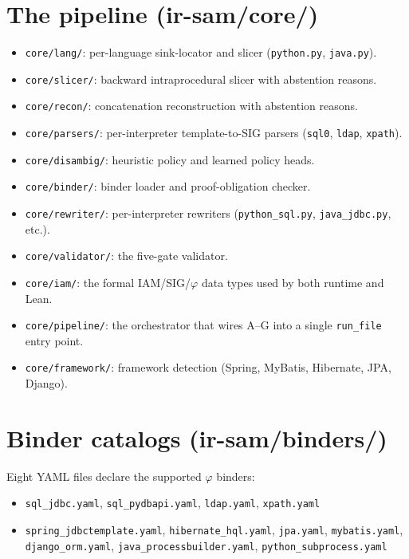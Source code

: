 \documentclass[a4paper,11pt]{report}
\begin{document}
\section{The pipeline (ir-sam/core/)}
\begin{itemize}
\item \texttt{core/lang/}: per-language sink-locator and slicer (\texttt{python.py}, \texttt{java.py}).
\item \texttt{core/slicer/}: backward intraprocedural slicer with abstention reasons.
\item \texttt{core/recon/}: concatenation reconstruction with abstention reasons.
\item \texttt{core/parsers/}: per-interpreter template-to-SIG parsers (\texttt{sql0}, \texttt{ldap}, \texttt{xpath}).
\item \texttt{core/disambig/}: heuristic policy and learned policy heads.
\item \texttt{core/binder/}: binder loader and proof-obligation checker.
\item \texttt{core/rewriter/}: per-interpreter rewriters (\texttt{python\_sql.py}, \texttt{java\_jdbc.py}, etc.).
\item \texttt{core/validator/}: the five-gate validator.
\item \texttt{core/iam/}: the formal IAM/SIG/$\varphi$ data types used by both runtime and Lean.
\item \texttt{core/pipeline/}: the orchestrator that wires A--G into a single \texttt{run\_file} entry point.
\item \texttt{core/framework/}: framework detection (Spring, MyBatis, Hibernate, JPA, Django).
\end{itemize}

\section{Binder catalogs (ir-sam/binders/)}
Eight YAML files declare the supported $\varphi$ binders:
\begin{itemize}
\item \texttt{sql\_jdbc.yaml}, \texttt{sql\_pydbapi.yaml}, \texttt{ldap.yaml}, \texttt{xpath.yaml}
\item \texttt{spring\_jdbctemplate.yaml}, \texttt{hibernate\_hql.yaml}, \texttt{jpa.yaml}, \texttt{mybatis.yaml}, \texttt{django\_orm.yaml}, \texttt{java\_processbuilder.yaml}, \texttt{python\_subprocess.yaml}
\end{itemize}
\end{document}
